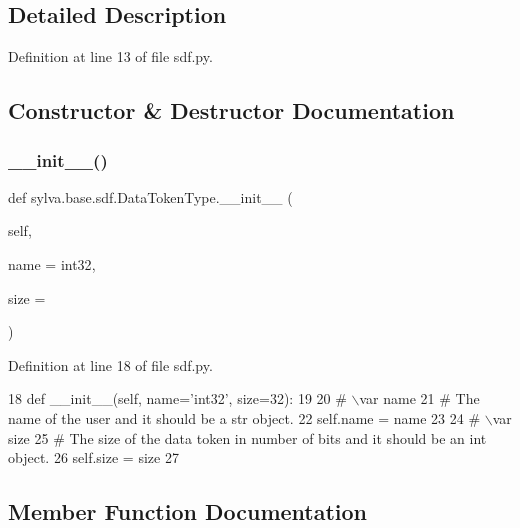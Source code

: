 \subsection{Detailed Description}


Definition at line 13 of file sdf.\+py.



\subsection{Constructor \& Destructor Documentation}
\mbox{\label{classsylva_1_1base_1_1sdf_1_1_data_token_type_add78d9084e28521d9c7fa6a334d2f6ec}} 
\subsubsection{\texorpdfstring{\+\_\+\+\_\+init\+\_\+\+\_\+()}{\_\_init\_\_()}}
{\footnotesize\ttfamily def sylva.\+base.\+sdf.\+Data\+Token\+Type.\+\_\+\+\_\+init\+\_\+\+\_\+ (\begin{DoxyParamCaption}\item[{}]{self,  }\item[{}]{name = {\ttfamily \textquotesingle{}int32\textquotesingle{}},  }\item[{}]{size = {} }\end{DoxyParamCaption})}



Definition at line 18 of file sdf.\+py.


\begin{DoxyCode}
18         \textcolor{keyword}{def }\_\_init\_\_(self, name='int32', size=32):
19 
20             \textcolor{comment}{# \(\backslash\)var name}
21             \textcolor{comment}{# The name of the user and it should be a str object.}
22             self.name = name
23 
24             \textcolor{comment}{# \(\backslash\)var size}
25             \textcolor{comment}{# The size of the data token in number of bits and it should be an int object.}
26             self.size = size
27 
\end{DoxyCode}


\subsection{Member Function Documentation}
\mbox{\label{classsylva_1_1base_1_1sdf_1_1_data_token_type_ad125c88296f6af2f66c19a4c70513bbc}} 
